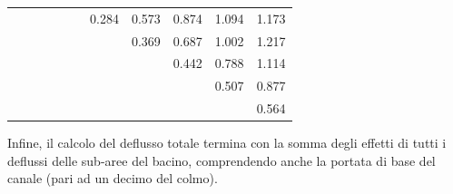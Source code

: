 \begin{table}[H]
\begin{tabular}{ccccccccccc}
                & \textbf{}               &                       &       &       &       & 0.284 & 0.573 & 0.874 & 1.094 & 1.173 \\
                & \textbf{}               &                       &       &       &       &       & 0.369 & 0.687 & 1.002 & 1.217 \\
                & \textbf{}               &                       &       &       &       &       &       & 0.442 & 0.788 & 1.114 \\
                & \textbf{}               &                       &       &       &       &       &       &       & 0.507 & 0.877 \\
                & \textbf{}               &                       &       &       &       &       &       &       &       & 0.564 \\ 
\bottomrule
    \end{tabular}
    \end{table}

Infine, il calcolo del deflusso totale termina con la somma degli effetti di tutti i deflussi delle sub-aree del bacino, comprendendo anche la portata di base del canale (pari ad un decimo del colmo). 

